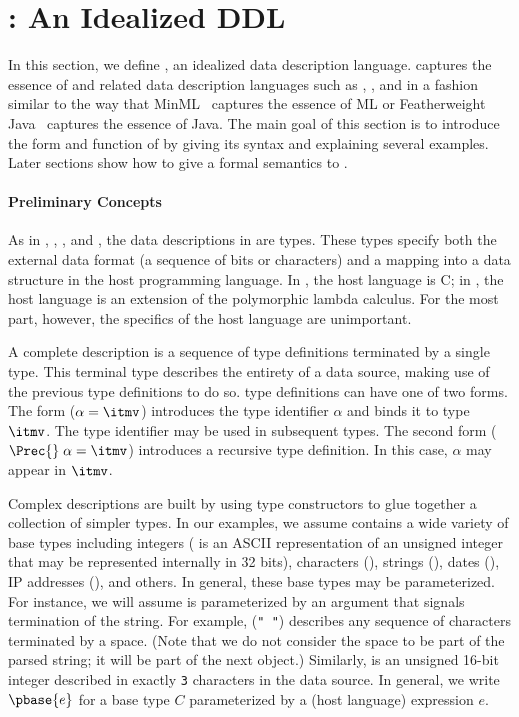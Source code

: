 \section{\ipads{}:  An Idealized DDL}
\label{sec:ipads}

In this section, we define \ipads{}, an idealized data description
language.  \ipads{} captures the essence of \padsc{} and related data
description languages such as \padsml{}, \packettypes{}, and
\datascript{} in a fashion similar to the way that
MinML~\cite{harper:plbook} captures the essence of ML or Featherweight
Java~\cite{igarasi+:featherweight} captures the essence of Java.  The
main goal of this section is to introduce the form and function of
\ipads{} by giving its syntax and explaining several examples.  Later
sections show how to give a formal semantics to \ipads{}.

\paragraph*{Preliminary Concepts}
As in \padsc{}, \padsml{}, 
\packettypes{}, and \datascript{}, the  data
descriptions in \ipads{} are types.  These types specify both the external data
format (a sequence of bits or characters) and a mapping into a
data structure in the host programming language.  In \padsc{},
the host language is C; in \ipads, the host language is an extension
of the polymorphic lambda calculus.  For the most part, however, the
specifics of the host language are unimportant.

A complete \ipads{} description is a sequence of type definitions
terminated by a single type.  This terminal type describes the
entirety of a data source, making use of the previous 
type definitions to do so.  \ipads{} type definitions can have one of
two forms.  The form ($\alpha = \itmv$) introduces the type identifier
$\alpha$ and binds it to \ipads{} type $\itmv$.
The type identifier may be used in
subsequent types.  The second form  ($\Prec{}\; \alpha = \itmv$) introduces
a recursive type definition.  In this case, $\alpha$ may appear in 
$\itmv$.

Complex \ipads{} descriptions are built by using type constructors to glue together a collection of simpler types. In our examples, we
assume \ipads{} contains a wide variety of base types including
integers (\Puint{} is an ASCII representation of an unsigned
integer that may be represented internally in 32 bits), 
characters (\Pchar), strings (\Pstring), dates
(\Pdate), IP addresses (\Pip), and others.  In general, these base
types may be parameterized.  For instance, we will assume \Pstring{} is
parameterized by an argument that signals termination of the
string.  For example, \Pstring({\tt " "}) describes any sequence of
characters terminated by a space. 
(Note that we do not consider the space to be part of the parsed string; 
it will be part of the next object.)
Similarly,  is an unsigned 16-bit
integer described in exactly {\tt 3} characters in the data source.
In general, we write $\pbase{e}$ for a base type $C$ parameterized by a
(host language) expression $e$.

